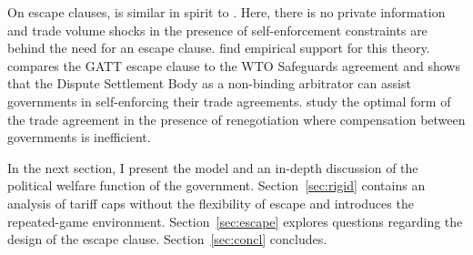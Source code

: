 On escape clauses, \Textcite{bs1990} is similar in spirit to \Textcite{bs2005}. Here, there is no private information and trade volume shocks in the presence of self-enforcement constraints are behind the need for an escape clause. \Textcite{bc} find empirical support for this theory. \Textcite{beshkar2010b} compares the GATT escape clause to the WTO Safeguards agreement and shows that the Dispute Settlement Body as a non-binding arbitrator can assist governments in self-enforcing their trade agreements. \Textcite{ms2012a} study the optimal form of the trade agreement in the presence of renegotiation where compensation between governments is inefficient.

In the next section, I present the model and an in-depth discussion of the political welfare function of the government. Section~\ref{sec:rigid} contains an analysis of tariff caps without the flexibility of escape and introduces the repeated-game environment. Section~\ref{sec:escape} explores questions regarding the design of the escape clause. Section~\ref{sec:concl} concludes.